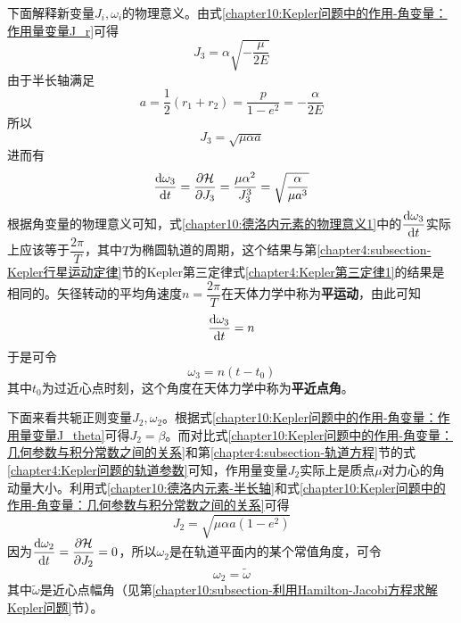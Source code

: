 下面解释新变量$J_i,\omega_i$的物理意义。由式\eqref{chapter10:Kepler问题中的作用-角变量：作用量变量J_r}可得
\begin{equation}
	J_3 = \alpha\sqrt{-\frac{\mu}{2E}}
\end{equation}
由于半长轴满足
\begin{equation}
	a = \frac12(r_1+r_2) = \frac{p}{1-e^2} = -\frac{\alpha}{2E}
	\label{chapter10:德洛内元素-半长轴}
\end{equation}
所以
\begin{equation}
	J_3 = \sqrt{\mu\alpha a}
\end{equation}
进而有
\begin{equation}
	\dfrac{\mathrm{d} \omega_3}{\mathrm{d} t} = \frac{\partial \mathcal{H}}{\partial J_3} = \frac{\mu\alpha^2}{J_3^3} = \sqrt{\frac{\alpha}{\mu a^3}}
	\label{chapter10:德洛内元素的物理意义1}
\end{equation}
根据角变量的物理意义可知，式\eqref{chapter10:德洛内元素的物理意义1}中的$\dfrac{\mathrm{d} \omega_3}{\mathrm{d} t}$实际上应该等于$\dfrac{2\pi}{T}$，其中$T$为椭圆轨道的周期，这个结果与第\ref{chapter4:subsection-Kepler行星运动定律}节的Kepler第三定律式\eqref{chapter4:Kepler第三定律1}的结果是相同的。矢径转动的平均角速度$n=\dfrac{2\pi}{T}$在天体力学中称为{\bf 平运动}，由此可知
\begin{equation*}
	\dfrac{\mathrm{d} \omega_3}{\mathrm{d} t} = n
\end{equation*}
于是可令
\begin{equation}
	\omega_3 = n(t-t_0)
\end{equation}
其中$t_0$为过近心点时刻，这个角度在天体力学中称为{\bf 平近点角}。

下面来看共轭正则变量$J_2, \omega_2$。根据式\eqref{chapter10:Kepler问题中的作用-角变量：作用量变量J_theta}可得$J_2=\beta$。而对比式\eqref{chapter10:Kepler问题中的作用-角变量：几何参数与积分常数之间的关系}和第\ref{chapter4:subsection-轨道方程}节的式\eqref{chapter4:Kepler问题的轨道参数}可知，作用量变量$J_2$实际上是质点$\mu$对力心的角动量大小。利用式\eqref{chapter10:德洛内元素-半长轴}和式\eqref{chapter10:Kepler问题中的作用-角变量：几何参数与积分常数之间的关系}可得
\begin{equation}
	J_2 = \sqrt{\mu\alpha a(1-e^2)}
\end{equation}
因为$\dfrac{\mathrm{d} \omega_2}{\mathrm{d} t} = \dfrac{\partial \mathcal{H}}{\partial J_2} = 0$，所以$\omega_2$是在轨道平面内的某个常值角度，可令
\begin{equation}
	\omega_2 = \tilde{\omega}
\end{equation}
其中$\tilde{\omega}$是近心点幅角（见第\ref{chapter10:subsection-利用Hamilton-Jacobi方程求解Kepler问题}节）。

